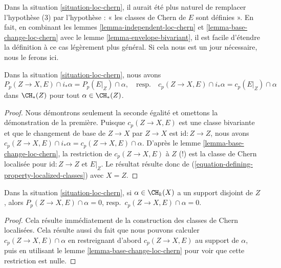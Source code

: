 \begin{remark}
\label{remark-loc-chern}
Dans la situation \ref{situation-loc-chern}, il aurait été plus naturel
de remplacer l'hypothèse (3) par l'hypothèse : « les classes de Chern
de $E$ sont définies ». En fait, en combinant les
lemmes \ref{lemma-independent-loc-chern} et
\ref{lemma-base-change-loc-chern}
avec le lemme \ref{lemma-envelope-bivariant},
il est facile d'étendre la définition à ce cas légèrement plus général.
Si cela nous est un jour nécessaire, nous le ferons ici.
\end{remark}

\begin{lemma}
\label{lemma-loc-chern-after-pushforward}
Dans la situation \ref{situation-loc-chern}, nous avons
$$
P_p(Z \to X, E) \cap i_*\alpha = P_p(E|_Z) \cap \alpha,
\quad\text{resp.}\quad
c_p(Z \to X, E) \cap i_*\alpha = c_p(E|_Z) \cap \alpha
$$
dans $\CH_*(Z)$ pour tout $\alpha \in \CH_*(Z)$.
\end{lemma}

\begin{proof}
Nous démontrons seulement la seconde égalité et omettons la démonstration de la première.
Puisque $c_p(Z \to X, E)$ est une classe bivariante et que le changement de
base de $Z \to X$ par $Z \to X$ est $\text{id} : Z \to Z$, nous avons
$c_p(Z \to X, E) \cap i_*\alpha = c_p(Z \to X, E) \cap \alpha$.
D'après le lemme \ref{lemma-base-change-loc-chern}, la restriction de
$c_p(Z \to X, E)$ à $Z$ (!) est la classe de Chern localisée pour
$\text{id} : Z \to Z$ et $E|_Z$. Le résultat résulte donc de
(\ref{equation-defining-property-localized-classes}) avec $X = Z$.
\end{proof}

\begin{lemma}
\label{lemma-loc-chern-disjoint}
Dans la situation \ref{situation-loc-chern},
si $\alpha \in \CH_k(X)$ a un support disjoint de $Z$, alors
$P_p(Z \to X, E) \cap \alpha = 0$, resp.\ $c_p(Z \to X, E) \cap \alpha = 0$.
\end{lemma}

\begin{proof}
Cela résulte immédiatement de la construction des classes de Chern localisées.
Cela résulte aussi du fait que nous pouvons calculer
$c_p(Z \to X, E) \cap \alpha$ en restreignant d'abord $c_p(Z \to X, E)$ au
support de $\alpha$, puis en utilisant
le lemme \ref{lemma-base-change-loc-chern}
pour voir que cette restriction est nulle.
\end{proof}

